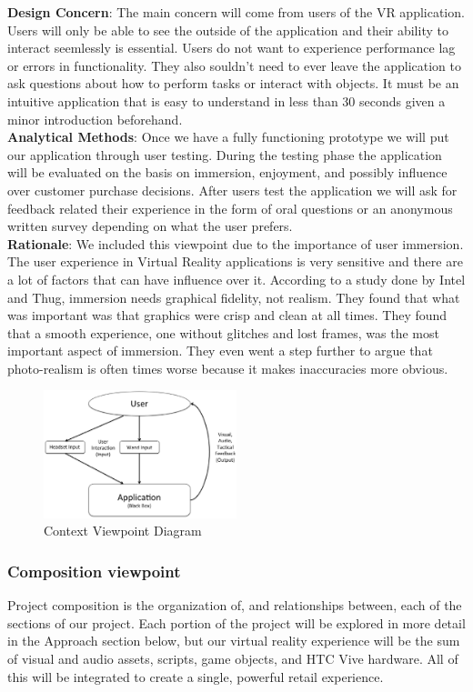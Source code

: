 \documentclass[10pt,journal,compsoc,onecolumn, draftclsnofoot]{IEEEtran}
\begin{document}
\hangindent=0.5cm \textbf{Design Concern}: The main concern will come from
users of the VR application. Users will only be able to see the outside of the
application and their ability to interact seemlessly is essential. Users do not
want to experience performance lag or errors in functionality. They also
souldn't need to ever leave the application to ask questions about how to
perform tasks or interact with objects. It must be an intuitive application
that is easy to understand in less than 30 seconds given a minor introduction
beforehand. \\

\hangindent=0.5cm \textbf{Analytical Methods}: Once we have a fully functioning
prototype we will put our application through user testing. During the testing
phase the application will be evaluated on the basis on immersion, enjoyment,
and possibly influence over customer purchase decisions. After users test the
application we will ask for feedback related their experience in the form of
oral questions or an anonymous written survey depending on what the user
prefers. \\

\hangindent=0.5cm \textbf{Rationale}: We included this viewpoint due to the importance of user immersion. The user experience in Virtual Reality applications is very sensitive and there are a lot of factors that can have influence over it. According to a study done by Intel and Thug\cite{michalak_lind_round1}, immersion needs graphical fidelity, not realism. They found that what was important was that graphics were crisp and clean at all times. They found that a smooth experience, one without glitches and lost frames, was the most important aspect of immersion. They even went a step further to argue that photo-realism is often times worse because it makes inaccuracies more obvious.

\begin{figure}[h]
\centering
\caption{Context Viewpoint Diagram}
\includegraphics[width=0.5\textwidth]{projectContext.eps}
\end{figure}
\subsubsection{Composition viewpoint}
Project composition is the organization of, and relationships between, each of
the sections of our project. Each portion of the project will be explored in
more detail in the Approach section below, but our virtual reality experience
will be the sum of visual and audio assets, scripts, game objects, and HTC Vive
hardware. All of this will be integrated to create a single, powerful retail
experience.\\
\end{document}
